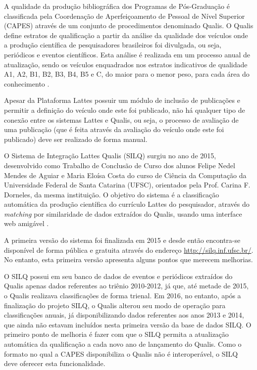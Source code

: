 \documentclass[12pt]{article}
\begin{document}
A qualidade da produção bibliográfica dos Programas de Pós-Graduação é classificada pela Coordenação de Aperfeiçoamento de Pessoal de Nível Superior (CAPES) através de um conjunto de procedimentos denominado Qualis. O Qualis define estratos de qualificação a partir da análise da qualidade dos veículos onde a produção científica de pesquisadores brasileiros foi divulgada, ou seja, periódicos e eventos científicos. Esta análise é realizada em um processo anual de atualização, sendo os veículos enquadrados nos estratos indicativos de qualidade A1, A2, B1, B2, B3, B4, B5 e C, do maior para o menor peso, para cada área do conhecimento \cite{CAPES-Classificacao}.

Apesar da Plataforma Lattes possuir um módulo de inclusão de publicações e permitir a definição do veículo onde este foi publicado, não há qualquer tipo de conexão entre os sistemas Lattes e Qualis, ou seja, o processo de avaliação de uma publicação (que é feita através da avaliação do veículo onde este foi publicado) deve ser realizado de forma manual.

O Sistema de Integração Lattes Qualis (SILQ) surgiu no ano de 2015, desenvolvido como Trabalho de Conclusão de Curso dos alunos Felipe Nedel Mendes de Aguiar e Maria Eloísa Costa do curso de Ciência da Computação da Universidade Federal de Santa Catarina (UFSC), orientados pela Prof. Carina F. Dorneles, da mesma instituição. O objetivo do sistema é a classificação automática da produção científica do currículo Lattes do pesquisador, através do \textit{matching} por similaridade de dados extraídos do Qualis, usando uma interface web amigável \cite{Silq1}.

A primeira versão do sistema foi finalizada em 2015 e desde então encontra-se disponível de forma pública e gratuita através do endereço \url{http://silq.inf.ufsc.br/}. No entanto, esta primeira versão apresenta alguns pontos que merecem melhorias.

O SILQ possui em seu banco de dados de eventos e periódicos extraídos do Qualis apenas dados referentes ao triênio 2010-2012, já que, até metade de 2015, o Qualis realizava classificações de forma trienal. Em 2016, no entanto, após a finalização do projeto SILQ, o Qualis alterou seu modo de operação para classificações anuais, já disponibilizando dados referentes aos anos 2013 e 2014, que ainda não estavam incluídos nesta primeira versão da base de dados SILQ. O primeiro ponto de melhoria é fazer com que o SILQ permita a atualização automática da qualificação a cada novo ano de lançamento do Qualis. Como o formato no qual a CAPES disponibiliza o Qualis não é interoperável, o SILQ deve oferecer esta funcionalidade.
\end{document}
